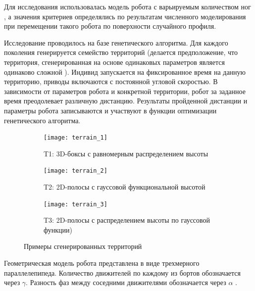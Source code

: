 Для исследования использовалась модель робота с варьируемым количеством ног , а значения критериев определялись по результатам численного моделирования при перемещении такого робота по поверхности случайного профиля.

Исследование проводилось на базе генетического алгоритма. Для каждого поколения генерируется семейство территорий (делается предположение, что территория, сгенерированная на основе одинаковых параметров является одинаково сложной ). Индивид запускается на фиксированное время на данную территорию, приводы включаются с постоянной угловой скоростью. В зависимости от параметров робота и конкретной территории, робот за заданное время преодолевает различную дистанцию. Результаты пройденной дистанции и параметры робота записываются и участвуют в функции оптимизации генетического алгоритма.

\begin{figure}[h]
    \begin{subfigure}{0.33\textwidth}
    \centering\texttt{[image: terrain\_1]} 
    \caption{T1: 3D-боксы с равномерным распределением высоты}
    \label{fig:terrain_1}
    \end{subfigure}
    \begin{subfigure}{0.33\textwidth}
    \centering\texttt{[image: terrain\_2]} 
    \caption{T2: 2D-полосы с гауссовой функциональной высотой}
    \label{fig:terrain_2}
    \end{subfigure}
    \begin{subfigure}{0.33\textwidth}
    \centering\texttt{[image: terrain\_3]}
    \caption{T3: 2D-полосы с распределением высоты по гауссовой функции)}
    \label{fig:terrain_3}
    \end{subfigure}
     
    \caption{Примеры сгенерированных территорий}
    \label{fig:terrains}
\end{figure}

Геометрическая модель робота представлена в виде трехмерного параллелепипеда. Количество движителей по каждому из бортов обозначается через $\gamma$. Разность фаз между соседними движителями обозначается через  $\alpha$ .

